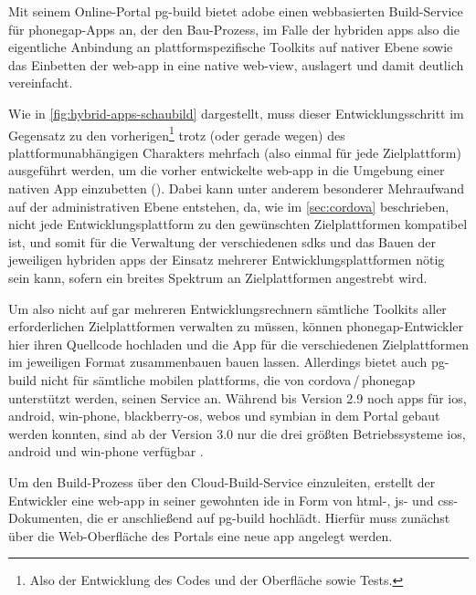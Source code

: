 {%

Mit seinem Online-Portal \gls{pg-build} bietet \gls{adobe} einen webbasierten Build-Service für \gls{phonegap}-Apps an, der den Bau-Prozess, im Falle der hybriden \glspl{app} also die eigentliche Anbindung an plattformspezifische Toolkits auf nativer Ebene sowie das Einbetten der \gls{web-app} in eine native \gls{web-view}, auslagert und damit deutlich vereinfacht.

Wie in \autoref{fig:hybrid-apps-schaubild} dargestellt, muss dieser Entwicklungsschritt im Gegensatz zu den vorherigen\footnote{Also der Entwicklung des Codes und der Oberfläche sowie Tests.} trotz (oder gerade wegen) des plattformunabhängigen Charakters mehrfach (also einmal für jede Zielplattform) ausgeführt werden, um die vorher entwickelte \gls{web-app} in die Umgebung einer nativen App einzubetten ().
Dabei kann unter anderem besonderer Mehraufwand auf der administrativen Ebene entstehen, da, wie im \autoref{sec:cordova} beschrieben, nicht jede Entwicklungsplattform zu den gewünschten Zielplattformen kompatibel ist, und somit für die Verwaltung der verschiedenen \glspl{sdk} und das Bauen der jeweiligen hybriden \glspl{app} der Einsatz mehrerer Entwicklungsplattformen nötig sein kann, sofern ein breites Spektrum an Zielplattformen angestrebt wird.

Um also nicht auf gar mehreren Entwicklungsrechnern sämtliche Toolkits aller erforderlichen Zielplattformen verwalten zu müssen, können \gls{phonegap}-Entwickler hier ihren Quellcode hochladen und die App für die verschiedenen Zielplattformen im jeweiligen Format zusammenbauen bauen lassen.
Allerdings bietet auch \gls{pg-build} nicht für sämtliche mobilen \glspl{plattform}, die von \gls{cordova}\,/\,\gls{phonegap} unterstützt werden, seinen Service an.
Während bis Version 2.9 noch \glspl{app} für \gls{ios}, \gls{android}, \gls{win-phone}, \gls{blackberry-os}, \gls{webos} und \gls{symbian} in dem Portal gebaut werden konnten,
sind ab der Version 3.0 nur die drei größten Betriebssysteme \gls{ios}, \gls{android} und \gls{win-phone} verfügbar \cite{PhoneGap_Build_Documentation_Supported-Platforms}.

Um den Build-Prozess über den Cloud-Build-Service einzuleiten, erstellt der Entwickler eine \gls{web-app} in seiner gewohnten \gls{ide} in Form von \gls{html}-, \gls{js}- und \gls{css}-Dokumenten, die er anschließend auf \gls{pg-build} hochlädt.
Hierfür muss zunächst über die Web-Oberfläche des Portals eine neue \gls{app} angelegt werden.

}
